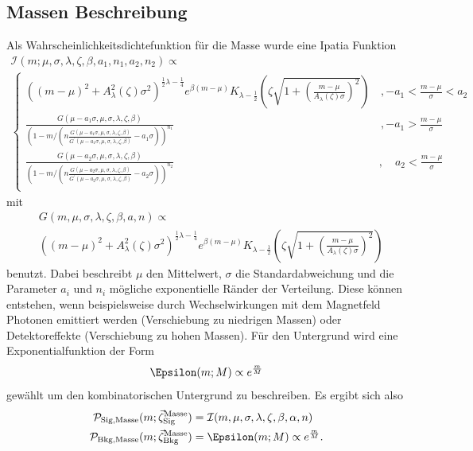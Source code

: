 \subsection{Massen Beschreibung}

Als Wahrscheinlichkeitsdichtefunktion für die Masse wurde eine Ipatia Funktion \cite{ipatia}
\begin{multline}
			\mathcal{I}(m;\mu,\sigma,\lambda,\zeta,\beta,a_1,n_1,a_2,n_2) \propto \\
			\begin{cases}
			\left(\left(m - \mu\right)^2 + A_{\lambda}^2(\zeta)\sigma^2\right)^{\frac{1}{2}\lambda - \frac{1}{4}} e^{\beta(m - \mu)} K_{\lambda - \frac{1}{2}}\left(\zeta\sqrt{1 + \left(\frac{m - \mu}{A_\lambda(\zeta)\sigma}\right)^2}\right)	&\, ,  - a_1 < \frac{m - \mu}{\sigma} < a_2 \\
			\frac{G(\mu - a_1 \sigma,\mu,\sigma,\lambda,\zeta,\beta)}{\left(1 - m/(n \frac{G(\mu - a_1\sigma,\mu,\sigma,\lambda,\zeta,\beta)}{G^\prime(\mu - a_1 \sigma,\mu,\sigma,\lambda,\zeta,\beta)} -a_1 \sigma)\right)^{n_1}}	&\, , - a_1 > \frac{m - \mu}{\sigma} \\
			\frac{G(\mu - a_2 \sigma,\mu,\sigma,\lambda,\zeta,\beta)}{\left(1 - m/(n \frac{G(\mu - a_2\sigma,\mu,\sigma,\lambda,\zeta,\beta)}{G^\prime(\mu - a_2 \sigma,\mu,\sigma,\lambda,\zeta,\beta)} -a_2 \sigma)\right)^{n_2}}	&,\quad a_2 < \frac{m - \mu}{\sigma} \\
			\end{cases}
			\label{eq:ipatia}
		\end{multline}
mit 
\begin{equation}
\begin{split}
&G(m,\mu,\sigma,\lambda,\zeta,\beta,a,n)\propto\\
&\left(\left(m-\mu\right)^2+A_\lambda^2(\zeta)\sigma^2\right)^{\frac{1}{2}\lambda-\frac{1}{4}}e^{\beta\left(m-\mu\right)}K_{\lambda-\frac{1}{2}}\left(\zeta\sqrt{1+\left(\frac{m-\mu}{A_\lambda(\zeta)\sigma}\right)^2}\right)
\end{split}
\end{equation}
benutzt. Dabei beschreibt $\mu$ den Mittelwert, $\sigma$ die Standardabweichung und die Parameter $a_i$ und $n_i$ mögliche exponentielle Ränder der Verteilung. Diese können entstehen, wenn beispielsweise durch Wechselwirkungen mit dem Magnetfeld Photonen emittiert werden (Verschiebung zu niedrigen Massen) oder Detektoreffekte (Verschiebung zu hohen Massen). Für den Untergrund wird eine Exponentialfunktion der Form
\begin{equation}
\Epsilon(m;M)\propto e^{\frac{m}{M}}
\end{equation}
gewählt um den kombinatorischen Untergrund zu beschreiben. Es ergibt sich also
\begin{equation}
\begin{split}
\mathcal{P}_\text{Sig,Masse}(m;\vec{\zeta}_\text{Sig}^\text{Masse})&=\mathcal{I}(m,\mu,\sigma,\lambda,\zeta,\beta,\alpha,n)\\
\mathcal{P}_\text{Bkg,Masse}(m;\vec{\zeta}_\text{Bkg}^\text{Masse})&=\Epsilon(m;M)\propto e^{\frac{m}{M}}.
\end{split}
\end{equation}
